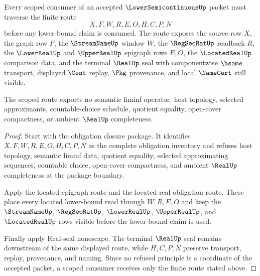 \begin{theorem}
\label{thm:lower-semicontinuous-scoped-route}
Every scoped consumer of an accepted $\LowerSemicontinuousUp$ packet must traverse the finite route
$$
X,F,W,R,E,O,H,C,P,N
$$
before any lower-bound claim is consumed. The route exposes the source row $X$, the graph row $F$, the $\StreamNameUp$ window $W$, the $\RegSeqRatUp$ readback $R$, the $\LowerRealUp$ and $\UpperRealUp$ epigraph rows $E,O$, the $\LocatedRealUp$ comparison data, and the terminal $\RealUp$ seal with componentwise $\hsame$ transport, displayed $\Cont$ replay, $\Pkg$ provenance, and local $\NameCert$ still visible.

The scoped route exports no semantic liminf operator, host topology, selected approximants, countable-choice schedule, quotient equality, open-cover compactness, or ambient $\RealUp$ completeness.
\end{theorem}
\begin{proof}
Start with the obligation closure package. It identifies $X,F,W,R,E,O,H,C,P,N$ as the complete obligation inventory and refuses host topology, semantic liminf data, quotient equality, selected approximating sequences, countable choice, open-cover compactness, and ambient $\RealUp$ completeness at the package boundary.

Apply the located epigraph route and the located-real obligation route. These place every located lower-bound read through $W,R,E,O$ and keep the $\StreamNameUp$, $\RegSeqRatUp$, $\LowerRealUp$, $\UpperRealUp$, and $\LocatedRealUp$ rows visible before the lower-bound claim is used.

Finally apply Real-seal nonescape. The terminal $\RealUp$ seal remains downstream of the same displayed route, while $H,C,P,N$ preserve transport, replay, provenance, and naming. Since no refused principle is a coordinate of the accepted packet, a scoped consumer receives only the finite route stated above.
\end{proof}

